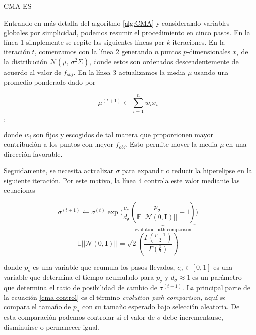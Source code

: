 \begin{algorithm}
{}
\caption{CMA-ES}
\label{alg:CMA}
\end{algorithm}

Entrando en más detalla del algoritmo \ref{alg:CMA} y considerando variables
globales por simplicidad, podemos resumir el procedimiento en cinco pasos.
En la línea 1 simplemente se repite las siguientes líneas por $k$ iteraciones.
En la iteración $t$, comenzamos con la línea 2 generando $n$ puntos
$p$-dimensionales $x_i$ de la distribución $\mathcal{N}(\mu,\,\sigma^{2} \Sigma)$, 
donde estos son ordenados descendentemente de acuerdo
al valor de $f_{obj}$.
En la línea 3 actualizamos la media $\mu$ usando una promedio ponderado dado
por

\begin{equation}
    \mu^{(t + 1)} \gets \sum_{i=1}^{n} w_i x_i
\label{cma-average}
\end{equation},

donde $w_i$ son fijos y escogidos de tal manera que proporcionen mayor
contribución a los puntos con meyor $f_{obj}$. Esto permite mover la media $\mu$
en una dirección favorable.

Seguidamente, se necesita actualizar $\sigma$ para expandir o reducir la
hiperelipse en la siguiente iteración. Por este motivo, la línea 4 controla
este valor mediante las ecuaciones

\begin{equation}
    \sigma^{(t + 1)} \gets \sigma^{(t)} \exp\bigg(\frac{c_{\sigma}}{d_{\sigma}} \underbrace{\left(\frac{||p_{\sigma}||}{\mathbb{E}||\mathcal{N}(0, \mathbf{I})||} - 1 \right)}_{\text{evolution path comparison}} \bigg)
\label{cma-control}
\end{equation}
\begin{equation}
\mathbb{E}||\mathcal{N}(0, \mathbf{I})|| = \sqrt{2} \left( \frac{\Gamma\left(\frac{p + 1}{2}\right)}{\Gamma\left({\frac{p}{2}}\right)} \right)
\label{cma-E}
\end{equation}

donde $p_{\sigma}$ es una variable que acumula los pasos llevados,
$c_{\sigma} \in [0, 1]$ es una variable que determina el tiempo acumulado para $p_{\sigma}$ y 
$d_{\sigma} \approx 1$ es un parámetro que determina el ratio de posibilidad de cambio de $\sigma^{(t + 1)}$. 
La principal parte de la ecuación \ref{cma-control} es el término \emph{evolution path comparison}, 
aquí se compara el tamaño de $p_{\sigma}$ con su tamaño esperado bajo selección
aleatoria.
De esta comparación podemos controlar si el valor de $\sigma$ debe
incrementarse, disminuirse o permanecer igual.


